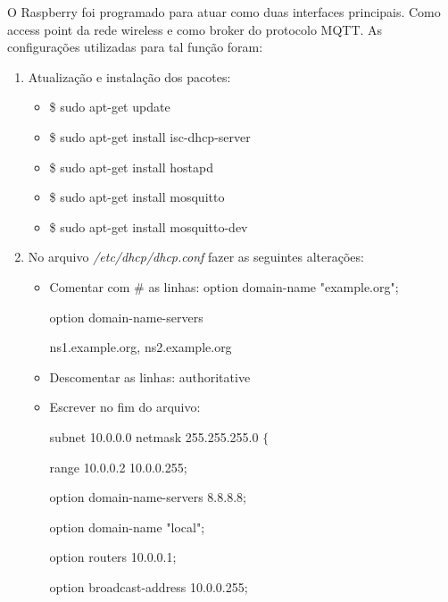 O Raspberry foi programado para atuar como duas interfaces principais. Como access point da rede wireless e como broker do protocolo MQTT. As configurações utilizadas para tal função foram:

\begin{enumerate}
    \item Atualização e instalação dos pacotes:
        \begin{itemize}
            \item \$ sudo apt-get update
            \item \$ sudo apt-get install isc-dhcp-server
            \item \$ sudo apt-get install hostapd
            \item \$ sudo apt-get install mosquitto
            \item \$ sudo apt-get install mosquitto-dev
        \end{itemize}
    
    \item No arquivo \textit{/etc/dhcp/dhcp.conf} fazer as seguintes alterações:
        \begin{itemize}
            \item Comentar com # as linhas:
                option domain-name "example.org";
                
                option domain-name-servers 
                
                ns1.example.org, ns2.example.org
            \item Descomentar as linhas:
                authoritative
            \item Escrever no fim do arquivo:

                subnet 10.0.0.0 netmask 255.255.255.0 $\{$

                \hspace*{6mm}    range 10.0.0.2 10.0.0.255;
                
                \hspace*{6mm}    option domain-name-servers 8.8.8.8;
                
                \hspace*{6mm}    option domain-name "local";
                
                \hspace*{6mm}    option routers 10.0.0.1;
                
                \hspace*{6mm}    option broadcast-address 10.0.0.255;
                

\end{itemize}
\end{enumerate}
